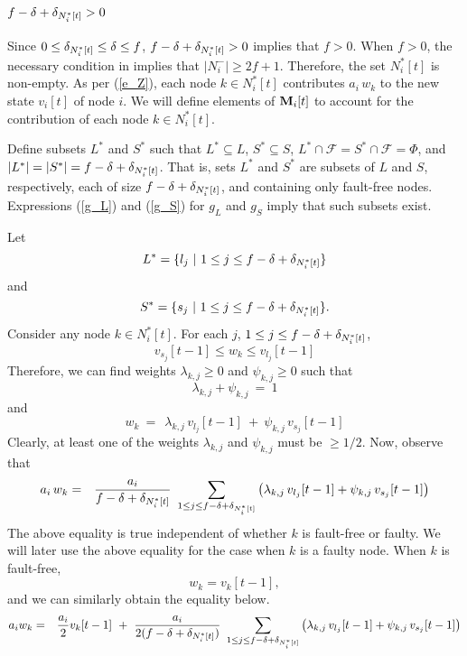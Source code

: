 \documentclass[letterpaper, 12pt]{article}
\newcommand{\scriptf}{\mathcal{F}}
\begin{document}
~

\subsubsection{$f-\delta+\delta_{N_i^*[t]}>0$}

Since $0\leq \delta_{N_i^*[t]}\leq\delta\leq f$,
$f-\delta+\delta_{N_i^*[t]}>0$ implies that $f>0$.
When $f>0$, the necessary condition in \cite{IBA_sync} implies that
$|N_i^-|\geq 2f+1$. Therefore, the set $N_i^*[t]$ is non-empty.
As per (\ref{e_Z}), each node $k\in N_i^*[t]$ contributes $a_i\, w_k$
to the new state $v_i[t]$ of node $i$. We will define elements
of ${\bf M}_i[t]$ to account for the contribution of each node $k\in N_i^*[t]$.

Define subsets $L^*$ and $S^*$ such that
$L^*\subseteq L$, $S^*\subseteq S$, $L^*\cap\scriptf=S^*\cap\scriptf=\Phi$,
and $|L^*|=|S^*|=f-\delta+\delta_{N_i^*[t]}$. That is, sets $L^*$ and $S^*$
are subsets of $L$ and $S$, respectively, each of size $f-\delta+\delta_{N_i^*[t]}$,
and containing only fault-free nodes.
Expressions (\ref{g_L}) and (\ref{g_S}) for $g_L$ and $g_S$
imply that such subsets exist.

Let 
\[ L^*=\{l_j~ | ~ 1\leq j\leq f-\delta+\delta_{N_i^*[t]}\}\]
and \[ S^*=\{s_j~ | ~ 1\leq j\leq f-\delta+\delta_{N_i^*[t]}\}.\]
Consider any node $k\in N_i^*[t]$.
For each $j$, $1\leq j\leq f-\delta+\delta_{N_i^*[t]}$,
\[ v_{s_j}[t-1] \leq w_k \leq v_{l_j}[t-1] \]
Therefore,
we can find weights $\lambda_{k,j}\geq 0$ and $\psi_{k,j}\geq 0$
 such that
\[
\lambda_{k,j} +  \psi_{k,j}~=~1\] and
\[
w_k~=~ ~\lambda_{k,j}\, v_{l_j}[t-1] ~ + ~
        \psi_{k,j} \, v_{s_j}[t-1] 
\]
Clearly, at least one of the weights $\lambda_{k,j}$ and $\psi_{k,j}$
must be $\geq 1/2$.
Now, observe that
\begin{eqnarray}
a_i\, w_k & = &  
\frac{a_i}{f-\delta+\delta_{N_i^*[t]}}  ~
\sum_{1\leq j\leq f-\delta+\delta_{N_i^*[t]}} 
\left(
\lambda_{k,j}\, v_{l_j}[t-1] +
        \psi_{k,j} \, v_{s_j}[t-1]
\right)
\label{e_faulty} 
\end{eqnarray}
The above equality is true independent of whether $k$ is fault-free or faulty.
We will later use the above equality for the case when $k$ is a faulty node.
When $k$ is fault-free, \[w_k=v_k[t-1],\] and we can similarly obtain the equality below.
\begin{eqnarray}
a_iw_k & = & \frac{a_i}{2}v_k[t-1]
             ~+~ 
	  \frac{a_i}{2(f-\delta+\delta_{N_i^*[t]})} ~
\sum_{1\leq j\leq f-\delta+\delta_{N_i^*[t]}} 
\left(
\lambda_{k,j}\, v_{l_j}[t-1]  + 
        \psi_{k,j} \, v_{s_j}[t-1]
\right) \nonumber\\
 \label{e_faultfree}
\end{eqnarray}
\end{document}
